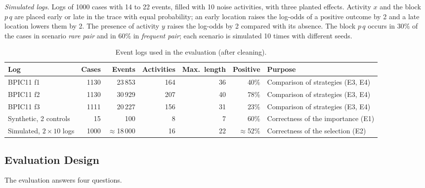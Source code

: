 \documentclass{article}
\begin{document}
\emph{Simulated logs.} Logs of 1000 cases with 14 to 22 events, filled with 10 noise activities, with three planted effects. Activity $x$ and the block $p\,q$ are placed early or late in the trace with equal probability; an early location raises the log-odds of a positive outcome by 2 and a late location lowers them by 2. The presence of activity $y$ raises the log-odds by 2 compared with its absence. The block $p\,q$ occurs in 30\% of the cases in scenario \emph{rare pair} and in 60\% in \emph{frequent pair}; each scenario is simulated 10 times with different seeds.

\begin{table}[H]
    \centering
    \caption{Event logs used in the evaluation (after cleaning).}
    \label{tab:data}
    \small
    \begin{tabular}{@{}lrrrrrl@{}}
        \toprule
        Log & Cases & Events & Activities & Max.\ length & Positive & Purpose \\
        \midrule
        BPIC11 f1 & 1130 & 23\,853 & 164 & 36 & 40\% & Comparison of strategies (E3, E4) \\
        BPIC11 f2 & 1130 & 30\,929 & 207 & 40 & 78\% & Comparison of strategies (E3, E4) \\
        BPIC11 f3 & 1111 & 20\,227 & 156 & 31 & 23\% & Comparison of strategies (E3, E4) \\
        Synthetic, 2 controls & 15 & 100 & 8 & 7 & 60\% & Correctness of the importance (E1) \\
        Simulated, $2 \times 10$ logs & 1000 & $\approx$18\,000 & 16 & 22 & $\approx$52\% & Correctness of the selection (E2) \\
        \bottomrule
    \end{tabular}
\end{table}

\subsection{Evaluation Design}

The evaluation answers four questions.
\end{document}
